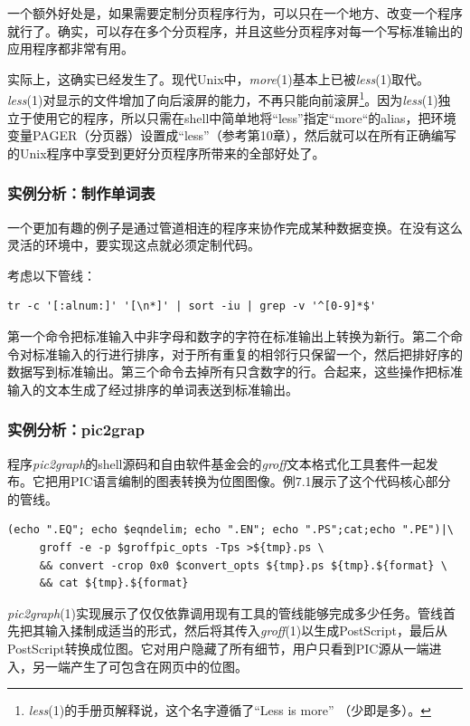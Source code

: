 \documentclass[12pt,oneside]{book}
\begin{document}
一个额外好处是，如果需要定制分页程序行为，可以只在一个地方、改变一个程序就行了。确实，可以存在多个分页程序，并且这些分页程序对每一个写标准输出的应用程序都非常有用。

实际上，这确实已经发生了。现代Unix中，\textit{more}(1)基本上已被\textit{less}(1)取代。\textit{less}(1)对显示的文件增加了向后滚屏的能力，不再只能向前滚屏\footnote{\textit{less}(1)的手册页解释说，这个名字遵循了“Less is more”  （少即是多）。}。因为\textit{less}(1)独立于使用它的程序，所以只需在shell中简单地将“less”指定“more“的alias，把环境变量PAGER（分页器）设置成“less”（参考第10章），然后就可以在所有正确编写的Unix程序中享受到更好分页程序所带来的全部好处了。



\subsubsection{实例分析：制作单词表}
一个更加有趣的例子是通过管道相连的程序来协作完成某种数据变换。在没有这么灵活的环境中，要实现这点就必须定制代码。

考虑以下管线：
\begin{Verbatim}
tr -c '[:alnum:]' '[\n*]' | sort -iu | grep -v '^[0-9]*$'
\end{Verbatim}

第一个命令把标准输入中非字母和数字的字符在标准输出上转换为新行。第二个命令对标准输入的行进行排序，对于所有重复的相邻行只保留一个，然后把排好序的数据写到标准输出。第三个命令去掉所有只含数字的行。合起来，这些操作把标准输入的文本生成了经过排序的单词表送到标准输出。


\subsubsection{实例分析：pic2grap}
程序\textit{pic2graph}的shell源码和自由软件基金会的\textit{groff}文本格式化工具套件一起发布。它把用PIC语言编制的图表转换为位图图像。例7.1展示了这个代码核心部分的管线。

\begin{Verbatim}[label=例7.1 pic2grah管线]
(echo ".EQ"; echo $eqndelim; echo ".EN"; echo ".PS";cat;echo ".PE")|\
     groff -e -p $groffpic_opts -Tps >${tmp}.ps \
     && convert -crop 0x0 $convert_opts ${tmp}.ps ${tmp}.${format} \
     && cat ${tmp}.${format}
\end{Verbatim}
\textit{pic2graph}(1)实现展示了仅仅依靠调用现有工具的管线能够完成多少任务。管线首先把其输入揉制成适当的形式，然后将其传入\textit{groff}(1)以生成PostScript，最后从PostScript转换成位图。它对用户隐藏了所有细节，用户只看到PIC源从一端进入，另一端产生了可包含在网页中的位图。
\end{document}
